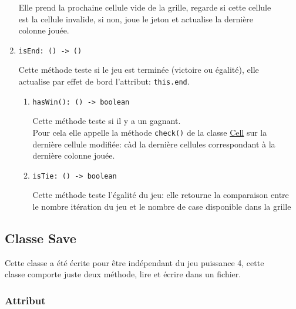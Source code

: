 \documentclass[11pt]{article}
\begin{document}
\begin{enumerate}
Elle prend la prochaine cellule vide de la grille, regarde si cette cellule\\
est la cellule invalide, si non, joue le jeton et actualise la dernière\\
colonne jouée.\\

\item \texttt{isEnd: () -> ()}
\label{sec:org9105e14}

Cette méthode teste si le jeu est terminée (victoire ou égalité), elle\\
actualise par effet de bord l'attribut: \texttt{this.end}.\\

\begin{enumerate}
\item \texttt{hasWin(): () -> boolean}
\label{sec:orga22370e}

Cette méthode teste si il y a un gagnant.\\

Pour cela elle appelle la méthode \texttt{check()} de la classe \hyperref[org4b22c5b]{Cell} sur la\\
dernière cellule modifiée: càd la dernière cellules correspondant à la\\
dernière colonne jouée.\\

\item \texttt{isTie: () -> boolean}
\label{sec:org72af636}

Cette méthode teste l'égalité du jeu: elle retourne la comparaison entre\\
le nombre itération du jeu et le nombre de case disponible dans la grille\\
\end{enumerate}
\end{enumerate}

\subsection{Classe Save\label{orgaf033c8}}
\label{sec:orgfca5dad}

Cette classe a été écrite pour être indépendant du jeu puissance 4, cette\\
classe comporte juste deux méthode, lire et écrire dans un fichier.\\

\subsubsection{Attribut}
\label{sec:orgdd53321}
\end{document}
